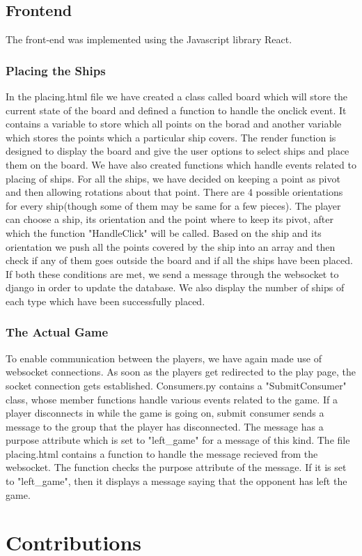 \documentclass[titlepage]{article}
\begin{document}
\subsection{Frontend}
The front-end was implemented using the Javascript library React.
\subsubsection{Placing the Ships}
In the placing.html file we have created a class called board which will store the current state of the board and defined a function to handle the onclick event. It contains a variable to store which all points on the borad and another variable which stores the points which a particular ship covers. The render function is designed to display the board and give the user options to select ships and place them on the board. We have also created functions which handle events related to placing of ships. For all the ships, we have decided on keeping a point as pivot and then allowing rotations about that point. There are 4 possible orientations for every ship(though some of them may be same for a few pieces). The player can choose a ship, its orientation and the point where to keep its pivot, after which the function "HandleClick" will be called. Based on the ship and its orientation we push all the points covered by the ship into an array and then check if any of them goes outside the board and if all the ships have been placed. If both these conditions are met, we send a message through the websocket to django in order to update the database. We also display the number of ships of each type which have been successfully placed.

\subsubsection{The Actual Game}
To enable communication between the players, we have again made use of websocket connections. As soon as the players get redirected to the play page, the socket connection gets established. Consumers.py contains a "SubmitConsumer" class, whose member functions handle various events related to the game. If a player disconnects in while the game is going on, submit consumer sends a message to the group that the player has disconnected. The message has a purpose attribute which is set to "left\_game" for a message of this kind. The file placing.html contains a function to handle the message recieved from the websocket. The function checks the purpose attribute of the message. If it is set to "left\_game", then it displays a message saying that the opponent has left the game.
\section{Contributions}
\end{document}
